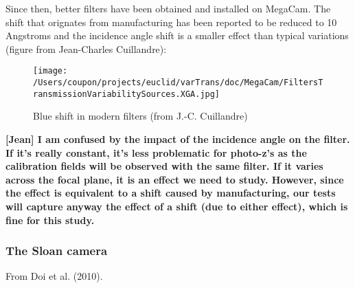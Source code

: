 \documentclass[11pt]{article}
\makeatletter
\def\maxwidth{\ifdim\Gin@nat@width>\linewidth\linewidth
    \else\Gin@nat@width\fi}
\let\Oldincludegraphics\includegraphics
\renewcommand{\includegraphics}[1]{\Oldincludegraphics[width=.8\maxwidth]{#1}}
\makeatother
\begin{document}
Since then, better filters have been obtained and installed on MegaCam.
The shift that orignates from manufacturing has been reported to be
reduced to 10 Angstroms and the incidence angle shift is a smaller
effect than typical variations (figure from Jean-Charles Cuillandre):

\begin{figure}
\centering
\texttt{[image: /Users/coupon/projects/euclid/varTrans/doc/MegaCam/FiltersTransmissionVariabilitySources.XGA.jpg]}
\caption{Blue shift in modern filters (from J.-C. Cuillandre)}
\end{figure}

\textbf{{[}Jean{]} I am confused by the impact of the incidence angle on
the filter. If it's really constant, it's less problematic for photo-z's
as the calibration fields will be observed with the same filter. If it
varies across the focal plane, it is an effect we need to study.
However, since the effect is equivalent to a shift caused by
manufacturing, our tests will capture anyway the effect of a shift (due
to either effect), which is fine for this study.}

    \subsubsection{The Sloan camera}\label{the-sloan-camera}

From Doi et al. (2010).
\end{document}
